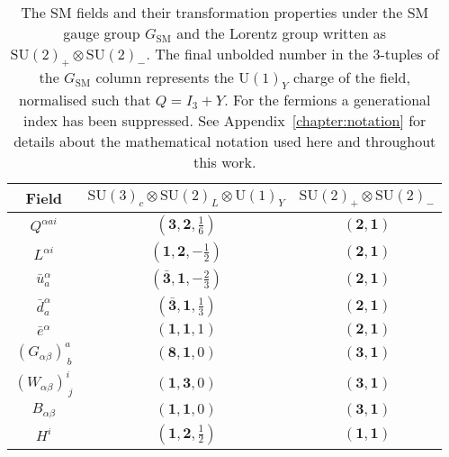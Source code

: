 \begin{table}[t]
  \centering
  \bgroup
  \def\arraystretch{1.3}%
  \begin{tabular}{ccc}
    \toprule
    Field                        & $\mathrm{SU}(3)_{c} \otimes \mathrm{SU}(2)_{L} \otimes \mathrm{U}(1)_{Y}$ & $\mathrm{SU}(2)_{+} \otimes \mathrm{SU}(2)_{-}$ \\
    \midrule
    $Q^{\alpha a i}$             & $(\mathbf{3}, \mathbf{2}, \tfrac{1}{6})$                                  & $(\mathbf{2}, \mathbf{1})$                      \\
    $L^{\alpha i}$               & $(\mathbf{1}, \mathbf{2}, -\tfrac{1}{2})$                                 & $(\mathbf{2}, \mathbf{1})$                      \\
    $\bar{u}^{\alpha}_a$                  & $(\bar{\mathbf{3}}, \mathbf{1}, -\tfrac{2}{3})$                           & $(\mathbf{2}, \mathbf{1})$                      \\
    $\bar{d}^{\alpha}_a$                  & $(\bar{\mathbf{3}}, \mathbf{1}, \tfrac{1}{3})$                            & $(\mathbf{2}, \mathbf{1})$                      \\
    $\bar{e}^{\alpha}$                    & $(\mathbf{1}, \mathbf{1}, 1)$                                             & $(\mathbf{2}, \mathbf{1})$                      \\
    $(G_{\alpha \beta})^a_{\ b}$ & $(\mathbf{8}, \mathbf{1}, 0)$                                             & $(\mathbf{3}, \mathbf{1})$                      \\
    $(W_{\alpha \beta})^i_{\ j}$ & $(\mathbf{1}, \mathbf{3}, 0)$                                             & $(\mathbf{3}, \mathbf{1})$                      \\
    $B_{\alpha \beta}$           & $(\mathbf{1}, \mathbf{1}, 0)$                                             & $(\mathbf{3}, \mathbf{1})$                      \\
    $H^{i}$                      & $(\mathbf{1}, \mathbf{2}, \tfrac{1}{2})$                                  & $(\mathbf{1}, \mathbf{1})$                      \\
    \bottomrule
  \end{tabular}
  \egroup
  \caption{The SM fields and their transformation properties under the SM gauge
    group $G_{\text{SM}}$ and the Lorentz group written as
    $\mathrm{SU}(2)_{+} \otimes \mathrm{SU}(2)_{-}$. The final unbolded number
    in the 3-tuples of the $G_{\text{SM}}$ column represents the
    $\mathrm{U}(1)_Y$ charge of the field, normalised such that $Q = I_{3} + Y$.
    For the fermions a generational index has been suppressed. See
    Appendix~\ref{chapter:notation} for details about the mathematical notation
    used here and throughout this work.}
  \label{tab:sm-fields}
\end{table}

